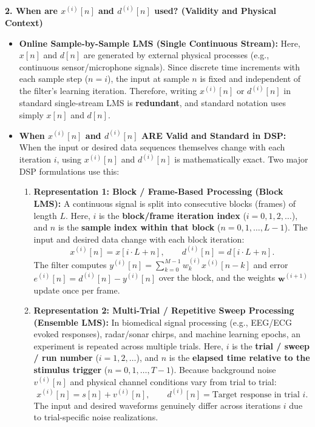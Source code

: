 \documentclass[11pt,a4paper]{article}
\begin{document}
\vspace{2mm}
\noindent\textbf{2. When are $x^{(i)}[n]$ and $d^{(i)}[n]$ used? (Validity and Physical Context)}
\begin{itemize}
    \item \textbf{Online Sample-by-Sample LMS (Single Continuous Stream):}
    Here, $x[n]$ and $d[n]$ are generated by external physical processes (e.g., continuous sensor/microphone signals). Since discrete time increments with each sample step ($n = i$), the input at sample $n$ is fixed and independent of the filter's learning iteration. Therefore, writing $x^{(i)}[n]$ or $d^{(i)}[n]$ in standard single-stream LMS is \textbf{redundant}, and standard notation uses simply $x[n]$ and $d[n]$.
    
    \item \textbf{When $x^{(i)}[n]$ and $d^{(i)}[n]$ ARE Valid and Standard in DSP:}
    When the input or desired data sequences themselves change with each iteration $i$, using $x^{(i)}[n]$ and $d^{(i)}[n]$ is mathematically exact. Two major DSP formulations use this:
    \begin{enumerate}
        \item \textbf{Representation 1: Block / Frame-Based Processing (Block LMS):}
        A continuous signal is split into consecutive blocks (frames) of length $L$. Here, $i$ is the \textbf{block/frame iteration index} ($i = 0, 1, 2, \dots$), and $n$ is the \textbf{sample index within that block} ($n = 0, 1, \dots, L-1$). The input and desired data change with each block iteration:
        \begin{equation}
        x^{(i)}[n] = x[i \cdot L + n], \qquad d^{(i)}[n] = d[i \cdot L + n].
        \end{equation}
        The filter computes $y^{(i)}[n] = \sum_{k=0}^{M-1} w_k^{(i)} x^{(i)}[n-k]$ and error $e^{(i)}[n] = d^{(i)}[n] - y^{(i)}[n]$ over the block, and the weights $\mathbf{w}^{(i+1)}$ update once per frame.
        
        \item \textbf{Representation 2: Multi-Trial / Repetitive Sweep Processing (Ensemble LMS):}
        In biomedical signal processing (e.g., EEG/ECG evoked responses), radar/sonar chirps, and machine learning epochs, an experiment is repeated across multiple trials. Here, $i$ is the \textbf{trial / sweep / run number} ($i = 1, 2, \dots$), and $n$ is the \textbf{elapsed time relative to the stimulus trigger} ($n = 0, 1, \dots, T-1$). Because background noise $v^{(i)}[n]$ and physical channel conditions vary from trial to trial:
        \begin{equation}
        x^{(i)}[n] = s[n] + v^{(i)}[n], \qquad d^{(i)}[n] = \text{Target response in trial } i.
        \end{equation}
        The input and desired waveforms genuinely differ across iterations $i$ due to trial-specific noise realizations.
    \end{enumerate}
\end{itemize}
\end{document}
